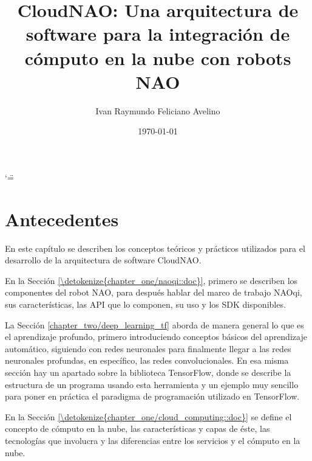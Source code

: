 \documentclass[letterpaper,12pt,spanish]{report}
\title{CloudNAO: Una arquitectura de software para la integración de
cómputo en la nube con robots NAO}
\date{\today}
\author{Ivan Raymundo Feliciano Avelino}
\begin{document}
\ifnum\catcode`\"=\active{}\fi
\maketitle
\sphinxtableofcontents








\chapter{Antecedentes}
\label{\detokenize{chapter_one:antecedentes}}\label{\detokenize{chapter_one::doc}}

En este capítulo se describen los conceptos 
teóricos y prácticos utilizados para el desarrollo
de la arquitectura de software CloudNAO.

En la Sección \ref{\detokenize{chapter_one/naoqi::doc}}, primero se describen los componentes del robot  
NAO, para después hablar del marco de trabajo NAOqi, sus características, las API que lo componen, su uso y los SDK disponibles. 

La Sección \ref{chapter_two/deep_learning_tf} 
aborda de manera general lo que es el aprendizaje 
profundo, primero introduciendo conceptos básicos del 
aprendizaje automático, siguiendo con redes neuronales 
para finalmente llegar a las redes neuronales profundas, 
en específico, las redes convolucionales. En esa misma 
sección hay un apartado sobre la biblioteca TensorFlow,
donde se describe la estructura de un programa
usando esta herramienta y un ejemplo muy
sencillo para poner en práctica el paradigma de programación utilizado
en TensorFlow.

En la Sección \ref{\detokenize{chapter_one/cloud_computing::doc}}
se define el concepto de cómputo en la nube, las 
características y capas de éste, 
las tecnologías que involucra y las diferencias entre los 
servicios y el cómputo en la nube.
\end{document}
